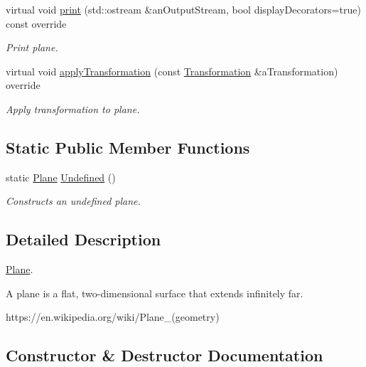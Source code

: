 \begin{DoxyCompactItemize}
virtual void \hyperlink{classostk_1_1math_1_1geom_1_1d3_1_1objects_1_1_plane_a312e63a716002b3bcf2954c1d30e7592}{print} (std\+::ostream \&an\+Output\+Stream, bool display\+Decorators=true) const override
\begin{DoxyCompactList}\small\item\em Print plane. \end{DoxyCompactList}\item 
virtual void \hyperlink{classostk_1_1math_1_1geom_1_1d3_1_1objects_1_1_plane_a4d96743e35df811f8c725561d353e245}{apply\+Transformation} (const \hyperlink{classostk_1_1math_1_1geom_1_1d3_1_1_transformation}{Transformation} \&a\+Transformation) override
\begin{DoxyCompactList}\small\item\em Apply transformation to plane. \end{DoxyCompactList}\end{DoxyCompactItemize}
\subsection*{Static Public Member Functions}
\begin{DoxyCompactItemize}
\item 
static \hyperlink{classostk_1_1math_1_1geom_1_1d3_1_1objects_1_1_plane}{Plane} \hyperlink{classostk_1_1math_1_1geom_1_1d3_1_1objects_1_1_plane_a162297dffbd860cd6c383e412708734f}{Undefined} ()
\begin{DoxyCompactList}\small\item\em Constructs an undefined plane. \end{DoxyCompactList}\end{DoxyCompactItemize}


\subsection{Detailed Description}
\hyperlink{classostk_1_1math_1_1geom_1_1d3_1_1objects_1_1_plane}{Plane}. 

A plane is a flat, two-\/dimensional surface that extends infinitely far.

https\+://en.wikipedia.\+org/wiki/\+Plane\+\_\+(geometry) 

\subsection{Constructor \& Destructor Documentation}
\mbox{\label{classostk_1_1math_1_1geom_1_1d3_1_1objects_1_1_plane_ac66c2a3b3d9d7cd1fd507123091bb38f}} 
